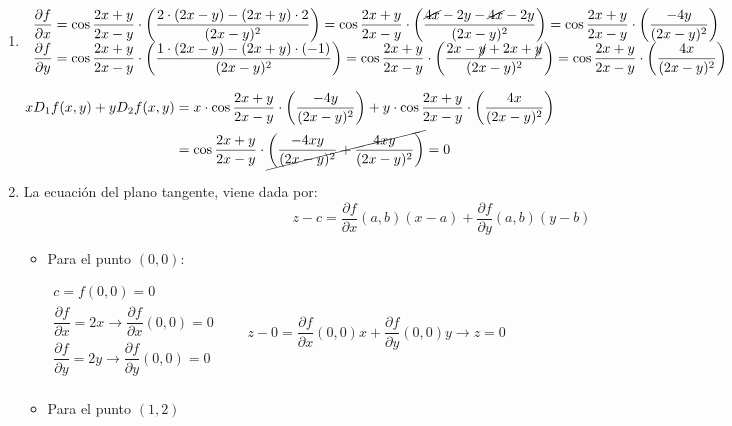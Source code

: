 \begin{enumerate}[label=\color{red}\textbf{\arabic*)}, leftmargin=*]
\item {}

$\begin{array}{l}
\dfrac{\partial f}{\partial x}=\cos\dfrac{2x+y}{2x-y}\cdot\left(\dfrac{2\cdot(2x-y)-(2x+y)\cdot2}{(2x-y)^{2}}\right)=\cos\dfrac{2x+y}{2x-y}\cdot\left(\dfrac{\cancel{4x}-2y-\cancel{4x}-2y}{(2x-y)^{2}}\right)=\cos\dfrac{2x+y}{2x-y}\cdot\left(\dfrac{-4y}{(2x-y)^{2}}\right)\\
\dfrac{\partial f}{\partial y}=\cos\dfrac{2x+y}{2x-y}\cdot\left(\dfrac{1\cdot(2x-y)-(2x+y)\cdot(-1)}{(2x-y)^{2}}\right)=\cos\dfrac{2x+y}{2x-y}\cdot\left(\dfrac{2x-\cancel{y}+2x+\cancel{y}}{(2x-y)^{2}}\right)=\cos\dfrac{2x+y}{2x-y}\cdot\left(\dfrac{4x}{(2x-y)^{2}}\right)
\end{array}$

$\begin{aligned}
xD_1f(x,y)+yD_2f(x,y)&=x\cdot\cos\dfrac{2x+y}{2x-y}\cdot\left(\dfrac{-4y}{(2x-y)^{2}}\right)+y\cdot\cos\dfrac{2x+y}{2x-y}\cdot\left(\dfrac{4x}{(2x-y)^{2}}\right)\\
&=\cos\dfrac{2x+y}{2x-y}\cdot\cancel{\left(\dfrac{-4xy}{(2x-y)^{2}}+\dfrac{4xy}{(2x-y)^{2}}\right)}=0
\end{aligned}$

\item {}

La ecuación del plano tangente, viene dada por: \[ z-c=\dfrac{\partial f}{\partial x}(a,b)(x-a)+\dfrac{\partial f}{\partial y}(a,b)(y-b) \]
\begin{itemize}
\item Para el punto $(0,0)$:

$\begin{array}{l}
c=f(0,0)=0\\
\dfrac{\partial f}{\partial x}=2x\longrightarrow\dfrac{\partial f}{\partial x}(0,0)=0\\
\dfrac{\partial f}{\partial y}=2y\longrightarrow\dfrac{\partial f}{\partial y}(0,0)=0\\
\end{array}\qquad z-0=\dfrac{\partial f}{\partial x}(0,0)x+\dfrac{\partial f}{\partial y}(0,0)y\longrightarrow z=0$

\item Para el punto $(1,2)$


\end{itemize}
\end{enumerate}
